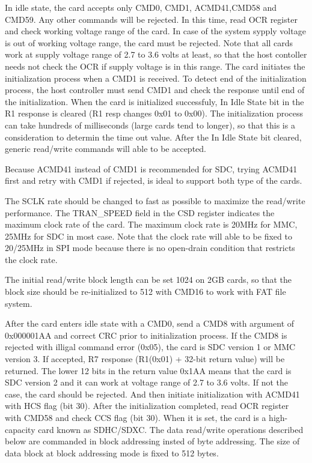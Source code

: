 In idle state, the card accepts only CMD0, CMD1, ACMD41,CMD58 and CMD59. Any
other commands will be rejected. In this time, read OCR register and check
working voltage range of the card. In case of the system sypply voltage is out
of working voltage range, the card must be rejected. Note that all cards work at
supply voltage range of 2.7 to 3.6 volts at least, so that the host contoller
needs not check the OCR if supply voltage is in this range. The card initiates
the initialization process when a CMD1 is received. To detect end of the
initialization process, the host controller must send CMD1 and check the
response until end of the initialization. When the card is initialized
successfuly, In Idle State bit in the R1 response is cleared (R1 resp changes
0x01 to 0x00). The initialization process can take hundreds of milliseconds
(large cards tend to longer), so that this is a consideration to determin the
time out value. After the In Idle State bit cleared, generic read/write commands
will able to be accepted.

Because ACMD41 instead of CMD1 is recommended for SDC, trying ACMD41 first and
retry with CMD1 if rejected, is ideal to support both type of the cards.

The SCLK rate should be changed to fast as possible to maximize the read/write
performance. The TRAN\_SPEED field in the CSD register indicates the maximum
clock rate of the card. The maximum clock rate is 20MHz for MMC, 25MHz for SDC
in most case. Note that the clock rate will able to be fixed to 20/25MHz in SPI
mode because there is no open-drain condition that restricts the clock rate.

The initial read/write block length can be set 1024 on 2GB cards, so that the
block size should be re-initialized to 512 with CMD16 to work with FAT file
system.


After the card enters idle state with a CMD0, send a CMD8 with argument of
0x000001AA and correct CRC prior to initialization process. If the CMD8 is
rejected with illigal command error (0x05), the card is SDC version 1 or MMC
version 3. If accepted, R7 response (R1(0x01) + 32-bit return value) will be
returned. The lower 12 bits in the return value 0x1AA means that the card is SDC
version 2 and it can work at voltage range of 2.7 to 3.6 volts. If not the case,
the card should be rejected. And then initiate initialization with ACMD41 with
HCS flag (bit 30). After the initialization completed, read OCR register with
CMD58 and check CCS flag (bit 30). When it is set, the card is a high-capacity
card known as SDHC/SDXC. The data read/write operations described below are
commanded in block addressing insted of byte addressing. The size of data block
at block addressing mode is fixed to 512 bytes.

